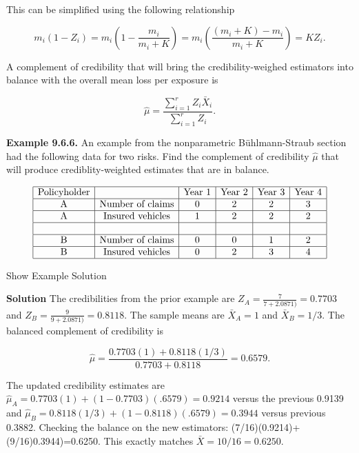 \documentclass[]{book}
\theoremstyle{definition}
\theoremstyle{definition}
\theoremstyle{definition}
\theoremstyle{remark}
\begin{document}
This can be simplified using the following relationship

\begin{equation*}  
m_i(1-Z_i)=m_i\left(1-\frac{m_i}{m_i+K}\right)=m_i\left(\frac{(m_i+K)-m_i}{m_i+K}\right)=KZ_i .
\end{equation*}

A complement of credibility that will bring the credibility-weighed
estimators into balance with the overall mean loss per exposure is

\begin{equation*}  
\hat{\mu}=\frac{\sum_{i=1}^r  Z_i \bar{X}_i}{\sum_{i=1}^r  Z_i}. \end{equation*}

\textbf{Example 9.6.6.} An example from the nonparametric
Bühlmann-Straub section had the following data for two risks. Find the
complement of credibility \(\hat{\mu}\) that will produce
crediblity-weighted estimates that are in balance.

\[\begin{matrix}
\begin{array}{|c|c|c|c|c|c|}
\hline
\text{Policyholder} &  & \text{Year 1} & \text{Year 2} & \text{Year 3} & \text{Year 4} \\
\hline
\text{A} & \text{Number of claims} & 0 & 2 & 2 & 3 \\
\hline
\text{A} & \text{Insured vehicles} &  1 & 2 & 2 & 2\\  
\hline
 & & & & & \\
\hline
\text{B} & \text{Number of claims} & 0 & 0 & 1 & 2\\    
\hline 
\text{B} & \text{Insured vehicles} &  0 & 2 & 3 & 4\\      
\hline
\end{array}
\end{matrix}\]

Show Example Solution

\hypertarget{toggleExampleCred.6.6}{}
\textbf{Solution} The credibilities from the prior example are
\(Z_A=\frac{7}{7+2.0871)}=0.7703\) and
\(Z_B=\frac{9}{9+2.0871)}=0.8118\). The sample means are \(\bar{X}_A=1\)
and \(\bar{X}_B=1/3\). The balanced complement of credibility is

\begin{equation*}  
\hat{\mu}=\frac{0.7703(1)+0.8118(1/3)}{0.7703+0.8118}=0.6579.
\end{equation*}

The updated credibility estimates are
\(\hat{\mu}_A=0.7703(1)+(1-0.7703)(.6579)=0.9214\) versus the previous
0.9139 and \(\hat{\mu}_B=0.8118(1/3)+(1-0.8118)(.6579)=0.3944\) versus
previous 0.3882. Checking the balance on the new estimators:
(7/16)(0.9214)+(9/16)0.3944)=0.6250. This exactly matches
\(\bar{X}=10/16=0.6250\).
\end{document}
